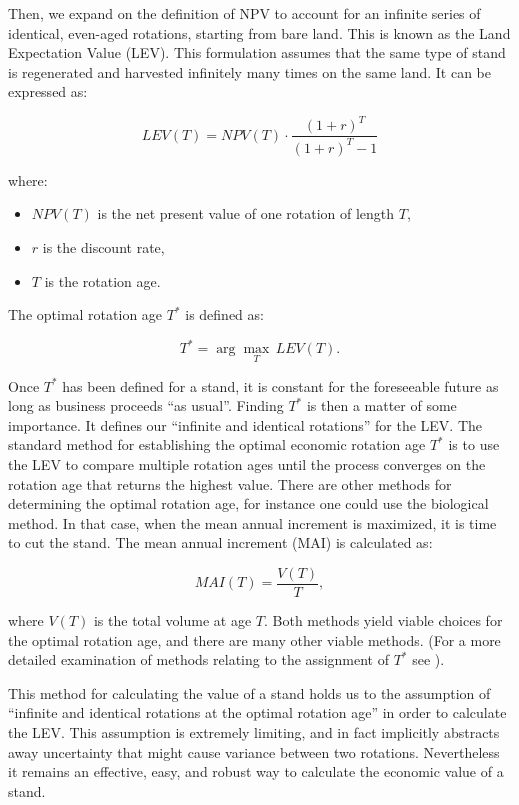 \documentclass[12pt]{report}
\begin{document}
Then, we expand on the definition of NPV to account for an infinite series of identical, even-aged rotations, starting from bare land. This is known as the Land Expectation Value (LEV). This formulation assumes that the same type of stand is regenerated and 
harvested infinitely many times on the same land. It can be expressed as:

\[
LEV(T) = NPV(T) \cdot \frac{(1 + r)^T}{(1 + r)^T - 1}
\]

where:
\begin{itemize}
    \item $NPV(T)$ is the net present value of one rotation of length $T$,
    \item $r$ is the discount rate,
    \item $T$ is the rotation age.
\end{itemize}

The optimal rotation age $T^*$ is defined as:

\[
T^* = \arg\max_{T} \, LEV(T).
\]


Once $T^*$ has been defined for a stand, it is constant for the foreseeable future as long as business proceeds ``as usual''. Finding $T^*$ is then a matter of some importance. It defines our ``infinite and identical rotations'' for the LEV. 
The standard method for establishing the optimal economic rotation age $T^*$ is to use the LEV to compare multiple rotation ages until the process converges on the rotation age that returns the highest value. There are other methods for determining the optimal rotation age, 
for instance one could use the biological method. In that case, when the mean annual increment is maximized, it is time to cut the stand. The mean annual increment (MAI) is calculated as:

\[
MAI(T) = \frac{V(T)}{T},
\]

where $V(T)$ is the total volume at age $T$. Both methods yield viable choices for the optimal rotation age, and there are many other viable methods. 
(For a more detailed examination of methods relating to the assignment of $T^*$ see \cite{BettingerAndLi2009}).

This method for calculating the value of a stand holds us to the assumption of ``infinite and identical rotations at the optimal rotation age'' in order to calculate the LEV. This assumption is extremely limiting, and in fact implicitly abstracts away uncertainty that might cause variance between two rotations. Nevertheless it remains an effective, easy, and robust way to calculate the economic value of a stand.
\end{document}
